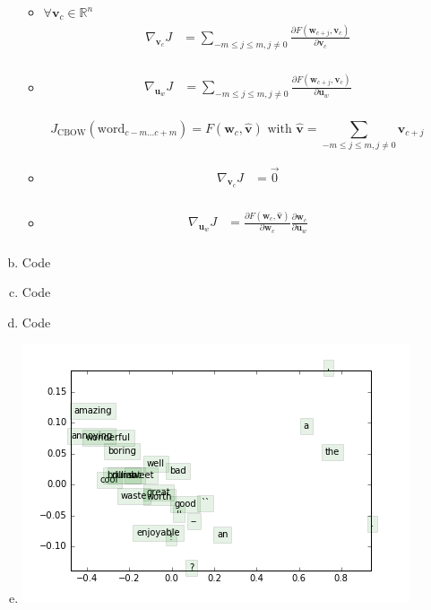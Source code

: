\documentclass[19pt]{extarticle}
\begin{document}
\begin{enumerate}[a)]
\begin{itemize}
\item  $\forall \bm{ v}_c \in \mathds{R}^n$
\begin{equation*}\begin{split}
\nabla_{\bm{v}_c}J &= \sum_{-m\leq j\leq m,j\neq 0}\frac{\partial F(\bm{w}_{c+j} , \bm{v}_c)}{\partial \bm{v}_c} \\
\end{split}\end{equation*}
\item \begin{equation*}\begin{split}
\nabla_{\bm{u}_w}J&= \sum_{-m\leq j\leq m,j\neq 0}\frac{\partial F(\bm{w}_{c+j} , \bm{v}_c)}{\partial \bm{u}_w} \\
\end{split}\end{equation*}

\end{itemize}

$$J_\text{CBOW}(\text{word}_{c-m...c+m}) = F(\bm{w}_c, \hat{\bm{v}}) \text{ with }\hat{\bm{v}} = \sum_{
-m\leq j \leq m,j\neq 0}
\bm{v}_{c+j}$$
\begin{itemize}
\item 
\begin{equation*}\begin{split}
\nabla_{\bm{v}_c}J &= \vec{0} \\
\end{split}\end{equation*}

\item \begin{equation*}\begin{split}
\nabla_{\bm{u}_w}J&=\frac{\partial  F(\bm{w}_c, \hat{\bm{v}})}{\partial \bm{w}_c}\frac{\partial \bm{w}_c}{\partial \bm{u}_w} \\
\end{split}\end{equation*}

\end{itemize}

\item Code

\item Code

\item Code

\item \includegraphics{q3_word_vectors.png}


\end{enumerate}
\end{document}
